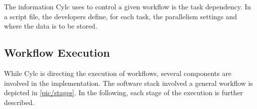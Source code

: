 \documentclass{superfri}
\begin{document}
The information Cylc uses to control a given workflow is the task dependency.
In a script file, the developers define, for each task, the parallelism settings and where the data is to be stored.

\subsection{Workflow Execution}

While Cylc is directing the execution of workflows, several components are involved in the implementation.
The software stack involved a general workflow is depicted in \cref{pic/stages}.
In the following, each stage of the execution is further described.

\end{document}
